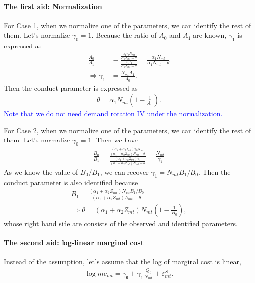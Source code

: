 \documentclass[11pt, a4paper]{article}
\begin{document}
\paragraph{The first aid: Normalization}

For Case 1, when we normalize one of the parameters, we can identify the rest of them. Let's normalize $\gamma_0 = 1$. Because the ratio of $A_0$ and $A_1$ are known, $\gamma_1$ is expressed as 
    \begin{align*}
        \frac{A_0}{A_1} &\equiv  \frac{\frac{\alpha_1 \gamma_0 N_{mt}}{\alpha_1 N_{mt}-\theta}}{\frac{\alpha_1 \gamma_1}{\alpha_1 N_{mt}-\theta}} = \frac{\alpha_1 N_{mt}}{\alpha_1 N_{mt}-\theta}\\
        \Longrightarrow \gamma_1 &= \frac{N_{mt}A_1}{A_0}.
    \end{align*}
    Then the conduct parameter is expressed as 
    \begin{align*}
        \theta = \alpha_1 N_{mt} \left(1 - \frac{1}{A_0}\right).
    \end{align*}
    \textcolor{blue}{Note that we do not need demand rotation IV under the normalization.}

For Case 2, when we normalize one of the parameters, we can identify the rest of them. Let's normalize $\gamma_0 = 1$.  Then we have 
    \begin{align*}
    \frac{B_0}{B_1} = \frac{\frac{(\alpha_1+\alpha_2 Z_{mt}) \gamma_0 N_{mt}}{(\alpha_1+\alpha_2 Z_{mt}) N_{mt}-\theta}}{\frac{(\alpha_1+\alpha_2 Z_{mt}) \gamma_1}{(\alpha_1+\alpha_2 Z_{mt}) N_{mt}-\theta}} = \frac{N_{mt}}{\gamma_1}
    \end{align*}
    As we know the value of $B_0/B_1$, we can recover $\gamma_1 = N_{mt}B_1/B_0$. Then the conduct parameter is also identified because \begin{align*}
        B_1 = \frac{(\alpha_1+\alpha_2 Z_{mt})N_{mt}B_1/B_0 }{(\alpha_1+\alpha_2 Z_{mt}) N_{mt}-\theta}\\
        \Longrightarrow \theta = (\alpha_1+\alpha_2 Z_{mt})N_{mt}\left(1 -\frac{1}{B_0}\right),
    \end{align*}
    whose right hand side are consists of the observed and identified parameters.


\paragraph{The second aid: log-linear marginal cost}

Instead of the assumption, let's assume that the log of marginal cost is linear, 
\begin{align*}
\log mc_{mt} = \gamma_0 + \gamma_1 \frac{Q_t}{N_{mt}} +\varepsilon_{mt}^{S}.
\end{align*}
\end{document}
